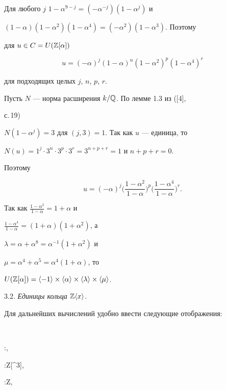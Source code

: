  


\begin{pf} 


Для любого $j$\; $1-\alpha^{9-j}=(-\alpha^{-j})(1-\alpha^j)$ и 


$(1-\alpha)(1-\alpha^2)(1-\alpha^4)=(-\alpha^2)(1-\alpha^3)$. Поэтому 


для $u\in C=U(\Bbb Z[\alpha])$ 


$$ 


u=(-\alpha)^j(1-\alpha)^n(1-\alpha^2)^p(1-\alpha^4)^r 


$$ 


для подходящих целых $j$, $n$, $p$, $r$. 


 


Пусть $N$ --- норма расширения $k/\Bbb Q$. По лемме 1.3 из ([4], 


с.\,19) 


$N(1-\alpha^j)=3$ для $(j,3)=1$. Так как $u$ --- единица, то 


$N(u)=1^j\cdot3^n\cdot3^p\cdot3^r=3^{n+p+r}=1$ и $n+p+r=0$. 


Поэтому 


$$ 


u=(-\alpha)^j\bigg(\frac{1-\alpha^2}{1-\alpha}\bigg)^p 


\bigg(\frac{1-\alpha^4}{1-\alpha}\bigg)^r. 


$$ 


Так как $\frac{1-\alpha^2}{1-\alpha}=1+\alpha$ и 


$\frac{1-\alpha^4}{1-\alpha}=(1+\alpha)(1+\alpha^2)$, а 


$\lambda=\alpha+\alpha^8=\alpha^{-1}(1+\alpha^2)$ и 


$\mu=\alpha^4+\alpha^5=\alpha^4(1+\alpha)$, то 


$U(\myza)=\la-1\ra\times\la\alpha\ra\times\la\lambda\ra 


\times\la\mu\ra$. 


\end{pf} 


 


3.2. {\it Единицы кольца} $\Bbb Z\langle x\rangle$. 


Для дальнейших вычислений удобно ввести следующие отображения: 


$$ 


\varphi:\myzx\to\myza,\quad 


\tau:\myzx\to\Bbb Z[\alpha^3],\quad 


\psi:\myzx\to\Bbb Z, 


